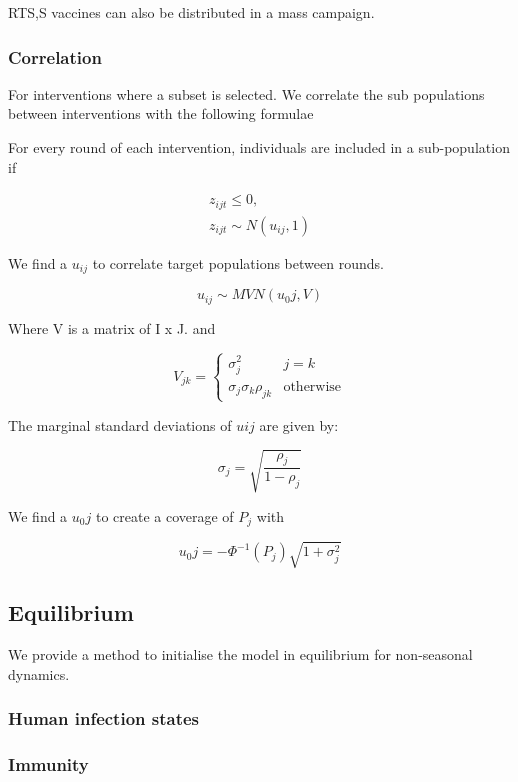 \documentclass{bmcart}
\begin{document}

RTS,S vaccines can also be distributed in a mass campaign.

\subsubsection*{Correlation}

For interventions where a subset is selected. We correlate the sub populations between interventions with the following formulae

For every round of each intervention, individuals are included in a sub-population if

\begin{gather*}
    z_{ijt} \leq 0, \\
    z_{ijt} \sim N(u_{ij}, 1)
\end{gather*}

We find a $u_{ij}$ to correlate target populations between rounds.

\[u_{ij} \sim MVN(u_0j, V)\]

Where V is a matrix of I x J. and

\[
V_{jk} =
\begin{cases} 
  \sigma_j^2  & j = k \\
  \sigma_j\sigma_k\rho_{jk} & \text{otherwise}
\end{cases}
\]

The marginal standard deviations of $uij$ are given by:

\[\sigma_j = \sqrt{\frac{\rho_j}{1 - \rho_j}}\]

We find a $u_0j$ to create a coverage of $P_j$ with

\[ u_0j = -\Phi^{-1}(P_j)\sqrt{1 + \sigma_j^2} \]

\subsection*{Equilibrium}

We provide a method to initialise the model in equilibrium for non-seasonal dynamics.

\subsubsection*{Human infection states}

\subsubsection*{Immunity}
\end{document}
